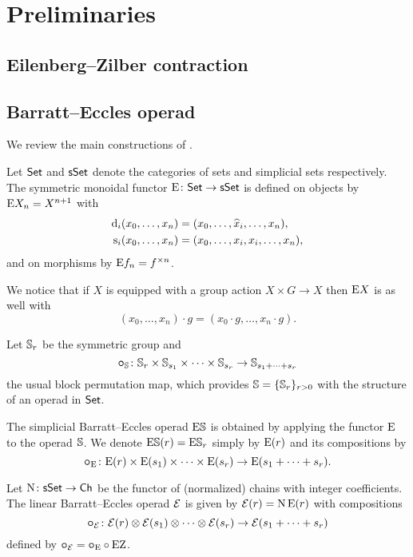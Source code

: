 
\section{Preliminaries}

\subsection{Eilenberg--Zilber contraction}

\TBW

\subsection{Barratt--Eccles operad}

We review the main constructions of \cite{berger2004combinatorial}.

\sssec

Let $\mathsf{Set}$ and $\mathsf{sSet}$ denote the categories of sets and simplicial sets respectively.
The symmetric monoidal functor $\mathrm{E} \colon \mathsf{Set} \to \mathsf{sSet}$ is defined on objects by $\mathrm{E} X_n = X^{n+1}$ with
\[
\begin{split}
	\operatorname{d}_i(x_0,\dots,x_n) &= (x_0,\dots,\widehat{x}_i,\dots,x_n), \\
	\operatorname{s}_i(x_0,\dots,x_n) &= (x_0, \dots, x_i, x_i, \dots, x_n),
\end{split}
\]
and on morphisms by $\mathrm{E} f_n = f^{\times n}$.

We notice that if $X$ is equipped with a group action $X \times G \to X$ then $\mathrm{E} X$ is as well with
\[
(x_0,\dots,x_n) \cdot g = (x_0 \cdot g, \dots, x_n \cdot g).
\]

\sssec

Let $\mathbb{S}_r$ be the symmetric group and
\[
\bm{\circ}_{\mathbb{S}} \colon \mathbb{S}_r \times \mathbb{S}_{s_1} \times \cdots \times \mathbb{S}_{s_r} \to \mathbb{S}_{s_1+\dots+s_r}
\]
the usual block permutation map, which provides $\mathbb{S} = \{\mathbb{S}_r\}_{r>0}$ with the structure of an operad in $\mathsf{Set}$.

\sssec

The simplicial Barratt--Eccles operad $\mathrm{E}\mathbb{S}$ is obtained by applying the functor $\mathrm{E}$ to the operad $\mathbb{S}$.
We denote $\mathrm{E}\mathbb{S}(r) = \mathrm{E}\mathbb{S}_r$ simply by $\mathrm{E}(r)$ and its compositions by
\[
\bm{\circ}_{\mathrm{E}} \colon \mathrm{E}(r) \times \mathrm{E}(s_1) \times\dots\times \mathrm{E}(s_r) \to \mathrm{E}(s_1+\dots+s_r).
\]

\sssec

Let $\operatorname{N} \colon \mathsf{sSet} \to \mathsf{Ch}$ be the functor of (normalized) chains with integer coefficients.
The linear Barratt--Eccles operad $\mathcal{E}$ is given by $\mathcal{E}(r) = \operatorname{N}\mathrm{E}(r)$ with compositions
\[
\bm{\circ}_{\mathcal{E}} \colon \mathcal{E}(r) \otimes \mathcal{E}(s_1) \otimes\dotsb\otimes \mathcal{E}(s_r) \to \mathcal{E}(s_1+\dots+s_r)
\]
defined by $\bm{\circ}_{\mathcal{E}} = \bm{\circ}_{\mathrm{E}} \circ \operatorname{EZ}$.

